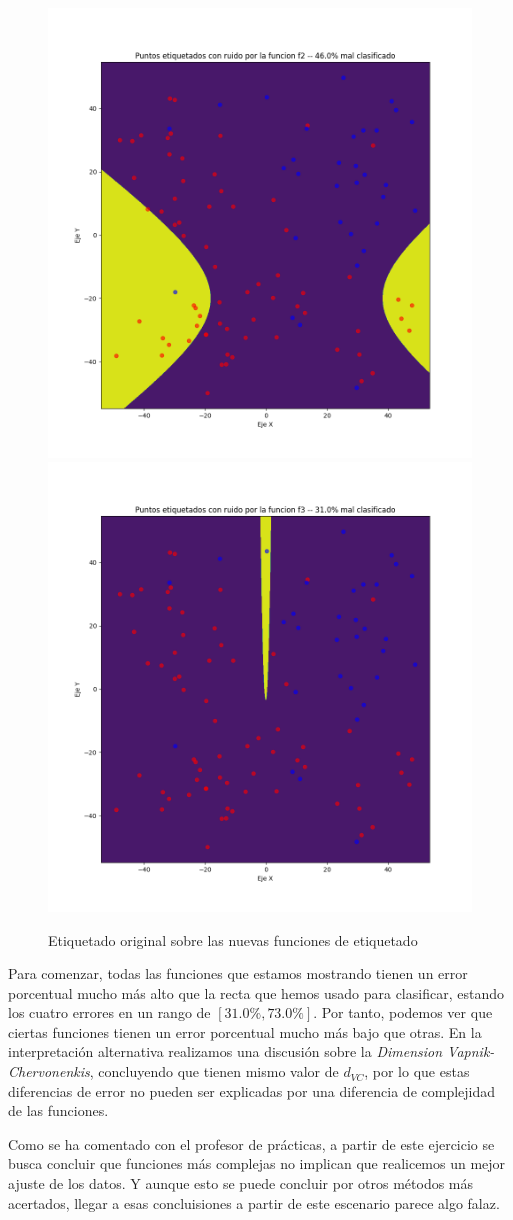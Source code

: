 \documentclass[11pt]{article}
\begin{document}
\begin{figure}[H]
    \includegraphics[width=0.60 \textwidth]{puntos_clasificados_f2.png}
    \includegraphics[width=0.60 \textwidth]{puntos_clasificados_f3.png}

    \caption{Etiquetado original sobre las nuevas funciones de etiquetado}
\end{figure}

Para comenzar, todas las funciones que estamos mostrando tienen un error porcentual mucho más alto que la recta que hemos usado para clasificar, estando los cuatro errores en un rango de $[31.0\%, 73.0\%]$. Por tanto, podemos ver que ciertas funciones tienen un error porcentual mucho más bajo que otras. En la interpretación alternativa realizamos una discusión sobre la \emph{Dimension Vapnik-Chervonenkis}, concluyendo que tienen mismo valor de $d_{VC}$, por lo que estas diferencias de error no pueden ser explicadas por una diferencia de complejidad de las funciones.

Como se ha comentado con el profesor de prácticas, a partir de este ejercicio se busca concluir que funciones más complejas no implican que realicemos un mejor ajuste de los datos. Y aunque esto se puede concluir por otros métodos más acertados, llegar a esas concluisiones a partir de este escenario parece algo falaz.
\end{document}
